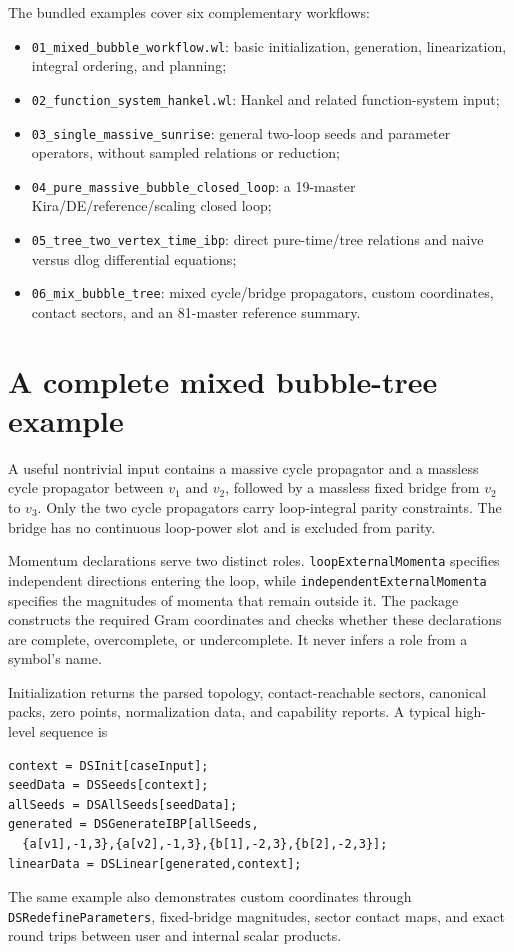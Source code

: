 ﻿\documentclass[a4paper,11pt]{article}
\begin{document}
The bundled examples cover six complementary workflows:
\begin{itemize}
  \item \texttt{01\_mixed\_bubble\_workflow.wl}: basic initialization, generation,
  linearization, integral ordering, and planning;
  \item \texttt{02\_function\_system\_hankel.wl}: Hankel and related function-system input;
  \item \texttt{03\_single\_massive\_sunrise}: general two-loop seeds and parameter operators,
  without sampled relations or reduction;
  \item \texttt{04\_pure\_massive\_bubble\_closed\_loop}: a 19-master Kira/DE/reference/scaling
  closed loop;
  \item \texttt{05\_tree\_two\_vertex\_time\_ibp}: direct pure-time/tree relations and
  naive versus dlog differential equations;
  \item \texttt{06\_mix\_bubble\_tree}: mixed cycle/bridge propagators, custom coordinates,
  contact sectors, and an 81-master reference summary.
\end{itemize}

\section{A complete mixed bubble-tree example}

A useful nontrivial input contains a massive cycle propagator and a massless cycle
propagator between $v_1$ and $v_2$, followed by a massless fixed bridge from $v_2$ to $v_3$.
Only the two cycle propagators carry loop-integral parity constraints. The bridge has no
continuous loop-power slot and is excluded from parity.

Momentum declarations serve two distinct roles. \texttt{loopExternalMomenta} specifies
independent directions entering the loop, while \texttt{independentExternalMomenta}
specifies the magnitudes of momenta that remain outside it. The package constructs the
required Gram coordinates and checks whether these declarations are complete, overcomplete,
or undercomplete. It never infers a role from a symbol's name.

Initialization returns the parsed topology, contact-reachable sectors, canonical packs,
zero points, normalization data, and capability reports. A typical high-level sequence is
\begin{verbatim}
context = DSInit[caseInput];
seedData = DSSeeds[context];
allSeeds = DSAllSeeds[seedData];
generated = DSGenerateIBP[allSeeds,
  {a[v1],-1,3},{a[v2],-1,3},{b[1],-2,3},{b[2],-2,3}];
linearData = DSLinear[generated,context];
\end{verbatim}
The same example also demonstrates custom coordinates through
\texttt{DSRedefineParameters}, fixed-bridge magnitudes, sector contact maps, and exact
round trips between user and internal scalar products.
\end{document}
